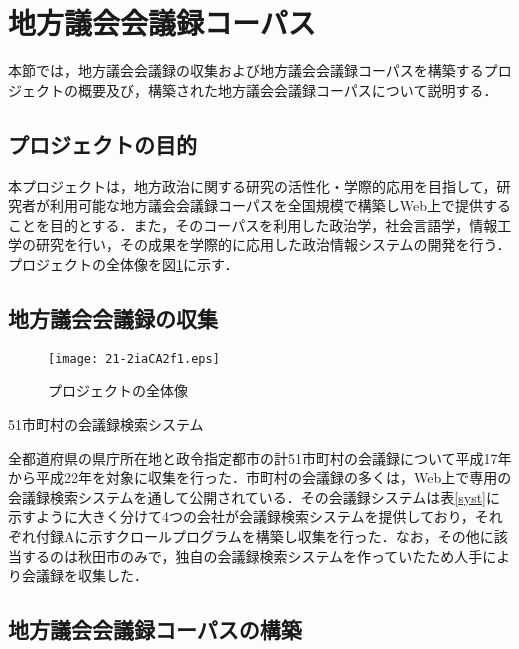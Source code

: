 \documentclass[japanese]{jnlp_1.4}
\begin{document}
\section{地方議会会議録コーパス}
\label{sec:aboutcgkc}

本節では，地方議会会議録の収集および地方議会会議録コーパスを構築するプロジェクトの概要及び，構築された地方議会会議録コーパスについて説明する． 


\subsection{プロジェクトの目的}

本プロジェクトは，地方政治に関する研究の活性化・学際的応用を目指して，研究者が利用可能な地方議会会議録コーパスを全国規模で構築しWeb上で提供することを目的とする．また，そのコーパスを利用した政治学，社会言語学，情報工学の研究を行い，その成果を学際的に応用した政治情報システムの開発を行う．プロジェクトの全体像を図\ref{zent}に示す．
\clearpage


\subsection{地方議会会議録の収集}

\begin{figure}[b]
\vspace{-0.8\Cvs}
 \begin{center}
 \texttt{[image: 21-2iaCA2f1.eps]}
 \end{center}
 \caption{プロジェクトの全体像}
 \label{zent}
\end{figure}

\begin{table}[b]
\caption{51市町村の会議録検索システム}
\label{syst}

\vspace*{-0.5\Cvs}
\end{table}

全都道府県の県庁所在地と政令指定都市の計51市町村の会議録について平成17年から平成22年を対象に収集を行った．市町村の会議録の多くは，Web上で専用の会議録検索システムを通して公開されている．その会議録システムは表\ref{syst}に示すように大きく分けて4つの会社が会議録検索システムを提供しており，それぞれ付録Aに示すクロールプログラムを構築し収集を行った．なお，その他に該当するのは秋田市のみで，独自の会議録検索システムを作っていたため人手により会議録を収集した．


\subsection{地方議会会議録コーパスの構築}
\end{document}
